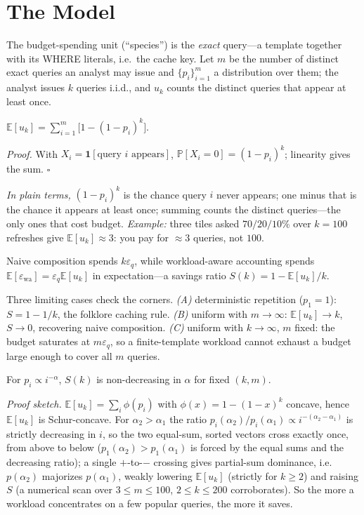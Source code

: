 \documentclass[runningheads]{llncs}
\newcommand{\eps}{\varepsilon}
\newcommand{\E}{\mathbb{E}}
\newcommand{\Prob}{\mathbb{P}}
\begin{document}
\section{The Model}
\label{sec:model}

The budget-spending unit (``species'') is the \emph{exact} query---a template together with its WHERE literals, i.e.\ the cache key. Let $m$ be the number of distinct exact queries an analyst may issue and $\{p_i\}_{i=1}^m$ a distribution over them; the analyst issues $k$ queries i.i.d., and $u_k$ counts the distinct queries that appear at least once.

\begin{proposition}\label{prop:eu}
$\E[u_k]=\sum_{i=1}^m\bigl[1-(1-p_i)^k\bigr]$.
\end{proposition}
\noindent\emph{Proof.} With $X_i=\mathbf 1[\text{query }i\text{ appears}]$, $\Prob[X_i{=}0]=(1-p_i)^k$; linearity gives the sum. \hfill$\square$

\smallskip\noindent\emph{In plain terms,} $(1-p_i)^k$ is the chance query $i$ never appears; one minus that is the chance it appears at least once; summing counts the distinct queries---the only ones that cost budget. \emph{Example:} three tiles asked $70/20/10\%$ over $k{=}100$ refreshes give $\E[u_k]\approx3$: you pay for $\approx3$ queries, not $100$.

\begin{proposition}\label{prop:sav}
Naive composition spends $k\eps_q$, while workload-aware accounting spends $\E[\eps_{\mathrm{wa}}]=\eps_q\E[u_k]$ in expectation---a savings ratio $S(k)=1-\E[u_k]/k$.
\end{proposition}
\noindent Three limiting cases check the corners. \emph{(A)} deterministic repetition ($p_1{=}1$): $S=1-1/k$, the folklore caching rule. \emph{(B)} uniform with $m\to\infty$: $\E[u_k]\to k$, $S\to0$, recovering naive composition. \emph{(C)} uniform with $k\to\infty$, $m$ fixed: the budget saturates at $m\eps_q$, so a finite-template workload cannot exhaust a budget large enough to cover all $m$ queries.

\begin{proposition}\label{prop:zipf}
For $p_i\propto i^{-\alpha}$, $S(k)$ is non-decreasing in $\alpha$ for fixed $(k,m)$.
\end{proposition}
\noindent\emph{Proof sketch.} $\E[u_k]=\sum_i\phi(p_i)$ with $\phi(x)=1-(1-x)^k$ concave, hence $\E[u_k]$ is Schur-concave. For $\alpha_2>\alpha_1$ the ratio $p_i(\alpha_2)/p_i(\alpha_1)\propto i^{-(\alpha_2-\alpha_1)}$ is strictly decreasing in $i$, so the two equal-sum, sorted vectors cross exactly once, from above to below ($p_1(\alpha_2)>p_1(\alpha_1)$ is forced by the equal sums and the decreasing ratio); a single $+$-to-$-$ crossing gives partial-sum dominance, i.e.\ $p(\alpha_2)$ majorizes $p(\alpha_1)$, weakly lowering $\E[u_k]$ (strictly for $k\ge2$) and raising $S$ (a numerical scan over $3\le m\le100$, $2\le k\le200$ corroborates). So the more a workload concentrates on a few popular queries, the more it saves.
\end{document}
